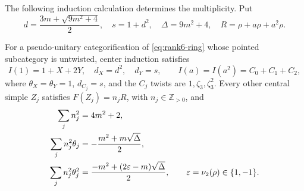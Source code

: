 The following induction calculation determines the multiplicity.
Put
\[
 d=\frac{3m+\sqrt{9m^2+4}}2,\quad s=1+d^2,\quad
 \Delta=9m^2+4,\quad R=\rho+a\rho+a^2\rho.
\]
\begin{lemma}
\label{lem:rank6-induction}
For a pseudo-unitary categorification of \eqref{eq:rank6-ring} whose
pointed subcategory is untwisted, center induction satisfies
\[
 I(1)=1+X+2Y,\quad d_X=d^2,\quad d_Y=s,
 \qquad I(a)=I(a^2)=C_0+C_1+C_2,
\]
where $\theta_X=\theta_Y=1$, $d_{C_j}=s$, and the $C_j$ twists are
$1,\zeta_3,\zeta_3^2$. Every other central simple $Z_j$ satisfies
$F(Z_j)=n_jR$, with $n_j\in\mathbb Z_{>0}$, and
\begin{align}
 \sum_jn_j^2&=4m^2+2,\notag\\
 \sum_jn_j^2\theta_j&=-\frac{m^2+m\sqrt\Delta}{2},
 \label{eq:indicator-first}\\
 \sum_jn_j^2\theta_j^2
 &=\frac{-m^2+(2\varepsilon-m)\sqrt\Delta}{2},
 \qquad\varepsilon=\nu_2(\rho)\in\{1,-1\}.
 \label{eq:indicator-second}
\end{align}
\end{lemma}
